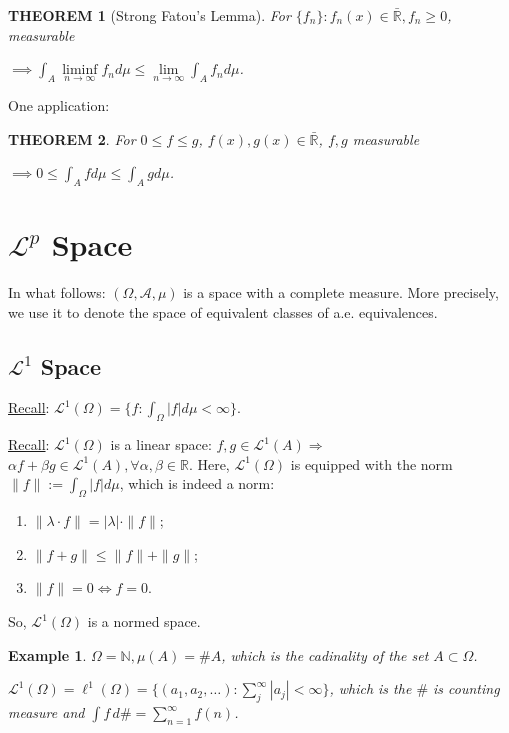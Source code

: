 \documentclass[12pt]{article}
\theoremstyle{blueplain}
\newtheorem{theorem}{THEOREM}[section]
\theoremstyle{bluedef}
\theoremstyle{blueremark}
\newtheorem{example}{Example}[section]
\newcommand{\R}{\mathbb{R}}
\newcommand{\N}{\mathbb{N}}
\newcommand{\mL}{\mathcal{L}}
\numberwithin{equation}{section}
\begin{document}
\begin{theorem}[Strong Fatou's Lemma]
  For $\{f_n\}: f_n(x) \in \bar{\R}, f_n \geq 0$, measurable

  $\implies \int_A \liminf\limits_{n \to \infty} f_n d\mu \leq \lim\limits_{n \to \infty} \int_A f_n d\mu$.
\end{theorem}

\noindent One application:

\begin{theorem}
  For $0 \leq f \leq g$, $f(x),g(x)\in \bar{\R}$, $f,g$ measurable

  $\implies 0 \leq \int_A f d\mu \leq \int_A g d\mu$.
\end{theorem}

\clearpage

\section{$\mathcal{L}^p$ Space}

In what follows: $(\Omega, \mathcal{A}, \mu)$ is a space with a complete measure. More precisely, we use it to denote the space of equivalent classes of a.e. equivalences.

\clearpage

\subsection{$\mL^{1}$ Space}

\underline{Recall}: $\mathcal{L}^1(\Omega) = \{f:\int_\Omega |f| d\mu < \infty\}$.

\noindent \underline{Recall}: $\mL^1(\Omega)$ is a linear space: $f,g \in \mathcal{L}^1(A) \Rightarrow$ $\alpha f + \beta g \in \mathcal{L}^1(A), \forall \alpha, \beta \in \R$. Here, $\mL^1(\Omega)$ is equipped with the norm $\|f\| := \int_\Omega |f| d\mu$, which is indeed a norm: \begin{enumerate}
  \item $\|\lambda \cdot f\| = |\lambda| \cdot \|f\|$;
  \item $\|f+g\| \leq \|f\| + \|g\|$;
  \item $\|f\| = 0 \iff f = 0$.
\end{enumerate} So, $\mL^1(\Omega)$ is a normed space.



\begin{example}
  $\Omega  = \N, \mu(A) = \# A$, which is the cadinality of the set $A \subset \Omega$.

  $\mL^1(\Omega) = \ell^1(\Omega) = \{(a_1, a_2, \ldots): \sum_j^\infty |a_j| < \infty\}$, which is the \(\#\) is counting measure and \(\int f\,d\#=\sum_{n=1}^\infty f(n)\).
\end{example}
\end{document}
